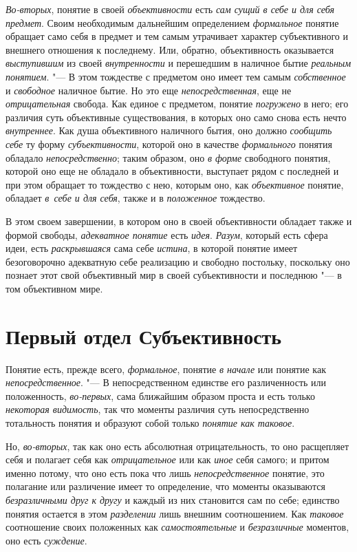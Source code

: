{\em Во-вторых}, понятие в своей {\em объективности}
есть {\em сам сущий в себе и для себя предмет}. Своим необходимым дальнейшим
определением {\em формальное}
понятие обращает само себя в предмет и тем самым утрачивает
характер субъективного и внешнего отношения к последнему. Или, обратно,
объективность оказывается {\em выступившим} из своей {\em внутренности}
и перешедшим в наличное бытие {\em реальным понятием}. "---
В этом тождестве с предметом оно имеет тем самым {\em собственное} и
{\em свободное} наличное бытие. Но это еще {\em непосредственная},
еще не {\em отрицательная} свобода. Как единое с предметом, понятие
{\em погружено} в него;
его различия суть объективные существования, в которых оно само снова есть
нечто {\em внутреннее}. Как душа объективного наличного бытия, оно должно
{\em сообщить себе} ту форму {\em субъективности}, которой оно в качестве
{\em формального} понятия обладало {\em непосредственно}; таким образом, оно
{\em в форме} свободного понятия, которой оно еще не обладало в
объективности, выступает рядом с последней и при этом обращает то тождество
с нею, которым оно, как {\em объективное} понятие, обладает
{\em в~себе и для себя}, также и в {\em положенное} тождество.

В этом своем завершении, в котором оно в своей объективности
обладает также и формой свободы, {\em адекватное понятие} есть
{\em идея}. {\em Разум}, который есть сфера идеи, есть {\em раскрывшаяся}
сама себе {\em истина}, в которой понятие имеет безоговорочно адекватную себе
реализацию и свободно постольку, поскольку оно познает этот свой
объективный мир в своей субъективности и последнюю "--- в том объективном мире.

\clearpage\part[Первый отдел\newline СУБЪЕКТИВНОСТЬ]{Первый отдел Субъективность}
Понятие есть, прежде всего, {\em формальное}, понятие {\em в начале} или
понятие как {\em непосредственное}. "---
В непосредственном единстве его различенность или
положенность, {\em во-первых}, сама ближайшим образом проста и есть только
{\em некоторая видимость}, так что моменты различия суть непосредственно
тотальность понятия и образуют собой только {\em понятие как таковое}.

Но, {\em во-вторых}, так как оно есть абсолютная отрицательность, то оно
расщепляет себя и полагает себя как {\em отрицательное} или
как {\em иное} себя самого; и притом именно потому, что оно есть пока что лишь
{\em непосредственное} понятие, это полагание или различение имеет то
определение, что моменты оказываются {\em безразличными друг к другу}
и каждый из них становится сам по себе; единство понятия
остается в этом {\em разделении} лишь внешним соотношением. Как
{\em таковое} соотношение своих положенных как {\em самостоятельные} и
{\em безразличные} моментов, оно есть {\em суждение}.

